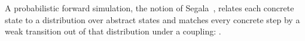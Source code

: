 \begin{definition}
  \label{def:forwardsim}
  \leanok
  A probabilistic forward simulation, the notion of Segala~\cite{Segala95}, relates each concrete state to a distribution over abstract states and matches every concrete step by a weak transition out of that distribution under a coupling: .
\end{definition}

